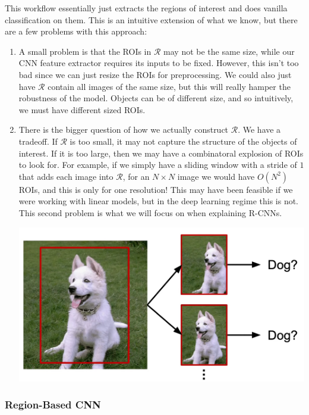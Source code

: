 \documentclass{article}
\theoremstyle{definition}
\theoremstyle{remark}
\theoremstyle{definition}
\begin{document}
    This workflow essentially just extracts the regions of interest and does vanilla classification on them. This is an intuitive extension of what we know, but there are a few problems with this approach: 
    \begin{enumerate}
      \item A small problem is that the ROIs in $\mathcal{R}$ may not be the same size, while our CNN feature extractor requires its inputs to be fixed. However, this isn't too bad since we can just resize the ROIs for preprocessing. We could also just have $\mathcal{R}$ contain all images of the same size, but this will really hamper the robustness of the model. Objects can be of different size, and so intuitively, we must have different sized ROIs. 

      \item There is the bigger question of how we actually construct $\mathcal{R}$. We have a tradeoff. If $\mathcal{R}$ is too small, it may not capture the structure of the objects of interest. If it is too large, then we may have a combinatoral explosion of ROIs to look for. For example, if we simply have a sliding window with a stride of $1$ that adds each image into $\mathcal{R}$, for an $N \times N$ image we would have $O(N^2)$ ROIs, and this is only for one resolution! This may have been feasible if we were working with linear models, but in the deep learning regime this is not. This second problem is what we will focus on when explaining R-CNNs. 
      
        \begin{center}
          \includegraphics[scale=0.3]{Images/sliding_window.png}
        \end{center}
    \end{enumerate}

    \subsubsection{Region-Based CNN}
\end{document}
